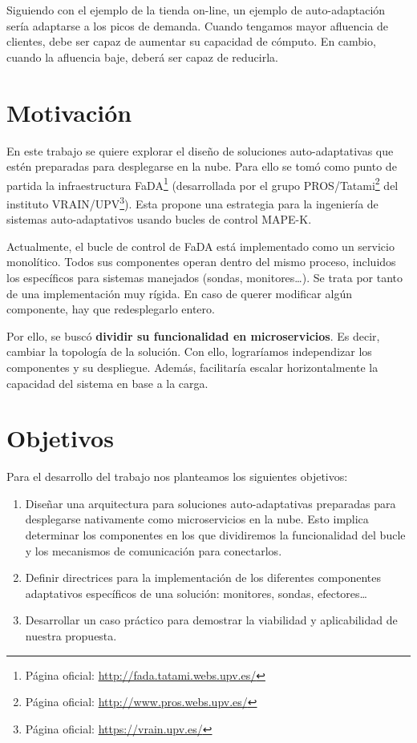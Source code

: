 Siguiendo con el ejemplo de la tienda on-line, un ejemplo de auto-adaptación sería adaptarse a los picos de demanda. Cuando tengamos mayor afluencia de clientes, debe ser capaz de aumentar su capacidad de cómputo. En cambio, cuando la afluencia baje, deberá ser capaz de reducirla.

\section{Motivación}

En este trabajo se quiere explorar el diseño de soluciones auto-adaptativas que estén preparadas para desplegarse en la nube. Para ello se tomó como punto de partida la infraestructura FaDA\footnote{Página oficial: \url{http://fada.tatami.webs.upv.es/}} (desarrollada por el grupo PROS/Tatami\footnote{Página oficial: \url{http://www.pros.webs.upv.es/}} del instituto VRAIN/UPV\footnote{Página oficial: \url{https://vrain.upv.es/}}). Esta propone una estrategia para la ingeniería de sistemas auto-adaptativos usando bucles de control MAPE-K\cite{ibmcorporationArchitecturalBlueprintAutonomic2006, fonsServiciosAdaptivereadyPara2021}.

Actualmente, el bucle de control de FaDA está implementado como un servicio monolítico. Todos sus componentes operan dentro del mismo proceso, incluidos los específicos para sistemas manejados (sondas, monitores\dots). Se trata por tanto de una implementación muy rígida. En caso de querer modificar algún componente, hay que redesplegarlo entero.

Por ello, se buscó \textbf{dividir su funcionalidad en microservicios}. Es decir, cambiar la topología de la solución. Con ello, lograríamos independizar los componentes y su despliegue. Además, facilitaría escalar horizontalmente la capacidad del sistema en base a la carga.

\section{Objetivos}

Para el desarrollo del trabajo nos planteamos los siguientes objetivos:

\begin{enumerate}
  \item Diseñar una arquitectura para soluciones auto-adaptativas preparadas para desplegarse nativamente como microservicios en la nube. Esto implica determinar los componentes en los que dividiremos la funcionalidad del bucle y los mecanismos de comunicación para conectarlos.

  \item Definir directrices para la implementación de los diferentes componentes adaptativos específicos de una solución: monitores, sondas, efectores\dots

  \item Desarrollar un caso práctico para demostrar la viabilidad y aplicabilidad de nuestra propuesta.
\end{enumerate}

